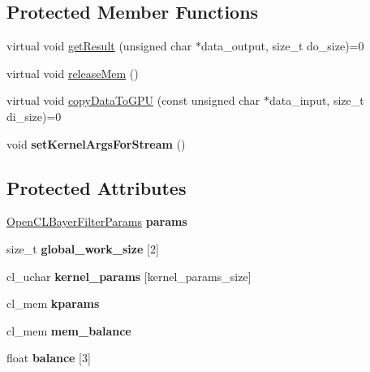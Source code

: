 \subsection*{Protected Member Functions}
\begin{DoxyCompactItemize}
\item 
virtual void \hyperlink{class_open_c_l_bayer_filter_a50325f961681d819961acfc99fec2fe5}{get\-Result} (unsigned char $\ast$data\-\_\-output, size\-\_\-t do\-\_\-size)=0
\item 
virtual void \hyperlink{class_open_c_l_bayer_filter_a43e509aca6345e0266bae6d1f76c5a72}{release\-Mem} ()
\item 
virtual void \hyperlink{class_open_c_l_bayer_filter_a85e7bb10cfd16da875c8ab82d84337a4}{copy\-Data\-To\-G\-P\-U} (const unsigned char $\ast$data\-\_\-input, size\-\_\-t di\-\_\-size)=0
\item 
\hypertarget{class_open_c_l_bayer_filter_a02f5b3e144a220c6cda4626e1ffd5baa}{void {\bfseries set\-Kernel\-Args\-For\-Stream} ()}\label{class_open_c_l_bayer_filter_a02f5b3e144a220c6cda4626e1ffd5baa}

\end{DoxyCompactItemize}
\subsection*{Protected Attributes}
\begin{DoxyCompactItemize}
\item 
\hypertarget{class_open_c_l_bayer_filter_aef5c712e709c7410afb176f6b10fe197}{\hyperlink{class_open_c_l_bayer_filter_params}{Open\-C\-L\-Bayer\-Filter\-Params} {\bfseries params}}\label{class_open_c_l_bayer_filter_aef5c712e709c7410afb176f6b10fe197}

\item 
\hypertarget{class_open_c_l_bayer_filter_a2be5251d1426f518ebda17808ab36036}{size\-\_\-t {\bfseries global\-\_\-work\-\_\-size} \mbox{[}2\mbox{]}}\label{class_open_c_l_bayer_filter_a2be5251d1426f518ebda17808ab36036}

\item 
\hypertarget{class_open_c_l_bayer_filter_a57f57696b18f7eb7c1970a2e4f7ef94c}{cl\-\_\-uchar {\bfseries kernel\-\_\-params} \mbox{[}kernel\-\_\-params\-\_\-size\mbox{]}}\label{class_open_c_l_bayer_filter_a57f57696b18f7eb7c1970a2e4f7ef94c}

\item 
\hypertarget{class_open_c_l_bayer_filter_ae7c11939dd3929466f79de5de8921d43}{cl\-\_\-mem {\bfseries kparams}}\label{class_open_c_l_bayer_filter_ae7c11939dd3929466f79de5de8921d43}

\item 
\hypertarget{class_open_c_l_bayer_filter_ae29dc77ad1a26089efd1c8191335073e}{cl\-\_\-mem {\bfseries mem\-\_\-balance}}\label{class_open_c_l_bayer_filter_ae29dc77ad1a26089efd1c8191335073e}

\item 
\hypertarget{class_open_c_l_bayer_filter_a7ab8551ca9a2c563b9f14d7ca9f6cf6e}{float {\bfseries balance} \mbox{[}3\mbox{]}}\label{class_open_c_l_bayer_filter_a7ab8551ca9a2c563b9f14d7ca9f6cf6e}

\end{DoxyCompactItemize}
